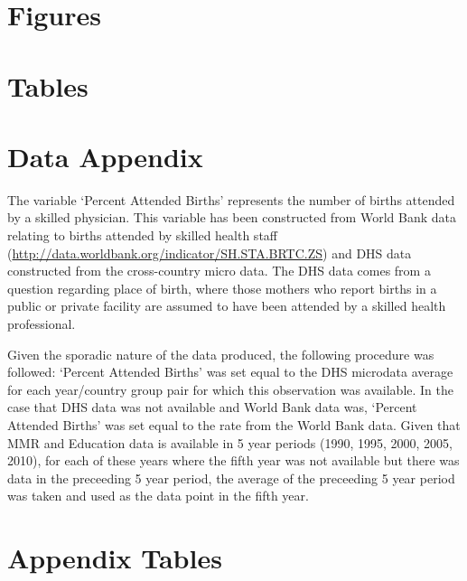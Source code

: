 \documentclass{article}[12pt,subeqn]
\newcommand{\MMRfolder}{"/home/damiancclarke/investigacion/Activa/MMR"}
\begin{document}
\begin{spacing}{1.4}
\newpage
\section*{Figures}


\section*{Tables}
%





\newpage



\appendix
\section{Data Appendix}
\label{scn:dataappendix}
The variable `Percent Attended Births' represents the number of births attended by a skilled physician.  This variable has been constructed 
from World Bank data relating to births attended by skilled health staff (\url{http://data.worldbank.org/indicator/SH.STA.BRTC.ZS}) and DHS 
data constructed from the cross-country micro data.  The DHS data comes from a question regarding place of birth, where those mothers who 
report births in a public or private facility are assumed to have been attended by a skilled health professional.  

Given the sporadic nature of the data produced, the following procedure was followed: `Percent Attended Births' was set equal to the DHS microdata 
average for each year/country group pair for which this observation was available.  In the case that DHS data was not available and World
Bank data was, `Percent Attended Births' was set equal to the rate from the World Bank data.  Given that MMR and Education data is available in 5 year 
periods (1990, 1995, 2000, 2005, 2010), for each of these years where the fifth year was not available but there was data in the preceeding 
5 year period, the average of the preceeding 5 year period was taken and used as the data point in the fifth year.

\newpage
\section{Appendix Tables}
\label{scn:coutriesappendix}

%

\end{spacing}
\end{document}
